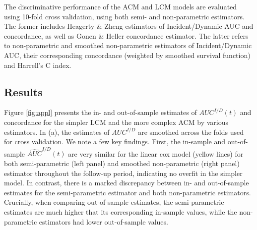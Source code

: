 \documentclass[useAMS,usenatbib, referee]{biom}
\begin{document}
The discriminative performance of the ACM and LCM models are evaluated using 10-fold cross validation, using both semi- and non-parametric estimators. The former includes Heagerty \& Zheng estimators of Incident/Dynamic AUC and concordance, as well as Gonen \& Heller concordance estimator. The latter refers to non-parametric and smoothed non-parametric estimators of Incident/Dynamic AUC, their corresponding concordance (weighted by smoothed survival function) and Harrell's C index.   



\subsection{Results}
\label{subsec:application_results}

Figure \ref{fig:appl} presents the in- and out-of-sample estimates of $AUC^{I/D}(t)$ and concordance for the simpler LCM and the more complex ACM by various estimators. In (a), the estimates of $AUC^{I/D}$ are smoothed across the folds used for cross validation. We note a few key findings. First, the in-sample and out-of-sample $\hat{AUC}^{I/D}(t)$ are very similar for the linear cox model (yellow lines) for both semi-parametric (left panel) and smoothed non-parametric (right panel) estimator throughout the follow-up period, indicating no overfit in the simpler model. In contrast, there is a marked discrepancy between in- and out-of-sample estimates for the semi-parametric estimator and both non-parametric estimators. Crucially, when comparing out-of-sample estimates, the semi-parametric estimates are much higher that its corresponding in-sample values, while the non-parametric estimators had lower out-of-sample values. 
\end{document}
